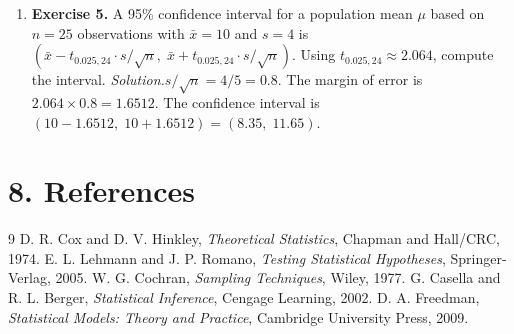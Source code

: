 \begin{enumerate}[leftmargin=*,itemsep=0.9em]
\item \textbf{Exercise 5.} A 95\% confidence interval for a population mean $\mu$ based on $n = 25$ observations with $\bar{x} = 10$ and $s = 4$ is $(\bar{x} - t_{0.025, 24} \cdot s/\sqrt{n},\; \bar{x} + t_{0.025, 24} \cdot s/\sqrt{n})$. Using $t_{0.025, 24} \approx 2.064$, compute the interval. \emph{Solution.}$s/\sqrt{n} = 4/5 = 0.8$. The margin of error is $2.064 \times 0.8 = 1.6512$. The confidence interval is $(10 - 1.6512,\; 10 + 1.6512) = (8.35,\; 11.65)$.

\end{enumerate}
\section*{8. References}
\begin{thebibliography}{9}
 D. R. Cox and D. V. Hinkley, \emph{Theoretical Statistics}, Chapman and Hall/CRC, 1974.
 E. L. Lehmann and J. P. Romano, \emph{Testing Statistical Hypotheses}, Springer-Verlag, 2005.
 W. G. Cochran, \emph{Sampling Techniques}, Wiley, 1977.
 G. Casella and R. L. Berger, \emph{Statistical Inference}, Cengage Learning, 2002.
 D. A. Freedman, \emph{Statistical Models: Theory and Practice}, Cambridge University Press, 2009.
\end{thebibliography}
